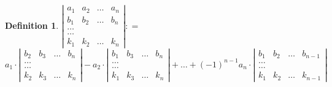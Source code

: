 \documentclass[a4paper,10pt]{report}
\newtheorem{mydef}{Definition}
\begin{document}
\begin{mydef}
$ \left | \begin {array}{rrrr} a_1 & a_2 & \dots  & a_n\\
                                b_1 & b_2 & \dots & b_n\\
                                \dots\\
                                \dots\\
                                k_1 & k_2 & \dots & k_n\end{array} \right
                                | : = $ \\
$a_1 \cdot \left | \begin {array}{rrrr} b_2 & b_3 & \dots & b_n\\
                                \dots\\
                                \dots\\
                                k_2 & k_3 & \dots & k_n\end{array}
                                \right |
- a_2 \cdot \left | \begin {array}{rrrr} b_1 & b_3 & \dots & b_n\\
                                \dots\\
                                \dots\\
                                k_1 & k_3 & \dots & k_n\end{array}
                                \right |
+ \dots + (-1)^{n-1}a_n\cdot \left | \begin {array}{rrrr} b_1 & b_2 & \dots & b_{n-1}\\
                                \dots\\
                                \dots\\
                                k_1 & k_2 & \dots & k_{n-1}\end{array}
                                \right |$
\end{mydef}
\vspace{0.5cm}
\end{document}
